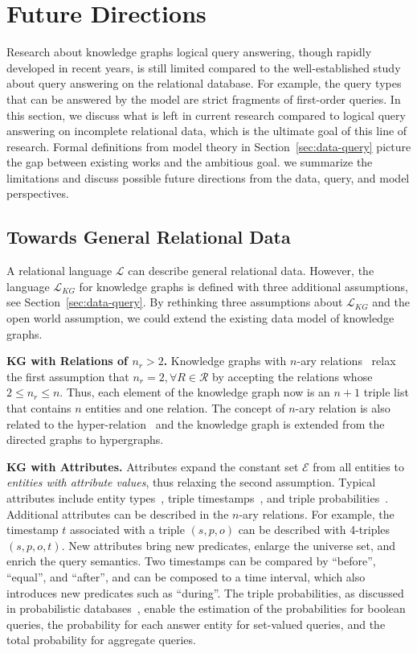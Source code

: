 \documentclass[11pt]{article}
\newcommand{\entity}{\mathcal{E}}
\newcommand{\relation}{\mathcal{R}}
\newcommand{\lang}{\mathcal{L}}
\begin{document}
\section{Future Directions}\label{sec:future}
Research about knowledge graphs logical query answering, though rapidly developed in recent years, is still limited compared to the well-established study about query answering on the relational database. For example, the query types that can be answered by the model are strict fragments of first-order queries.
In this section, we discuss what is left in current research compared to logical query answering on incomplete relational data, which is the ultimate goal of this line of research. Formal definitions from model theory in Section~\ref{sec:data-query} picture the gap between existing works and the ambitious goal. we summarize the limitations and discuss possible future directions from the data, query, and model perspectives.

\subsection{Towards General Relational Data}
A relational language $\lang$ can describe general relational data. However, the language $\lang_{KG}$ for knowledge graphs is defined with three additional assumptions, see Section~\ref{sec:data-query}. By rethinking three assumptions about $\lang_{KG}$ and the open world assumption, we could extend the existing data model of knowledge graphs.

\noindent\textbf{KG with Relations of $n_r > 2$.} Knowledge graphs with $n$-ary relations~\cite{Zhang2022FactTreeReasoning} relax the first assumption that $n_r=2, \forall R\in \relation$ by accepting the relations whose $2\leq n_r \leq n$. Thus, each element of the knowledge graph now is an $n+1$ triple list that contains $n$ entities and one relation. The concept of $n$-ary relation is also related to the hyper-relation~\cite{Galkin2020MessagePassing,Alivanistos2022QueryEmbedding} and the knowledge graph is extended from the directed graphs to hypergraphs.

\noindent\textbf{KG with Attributes.} Attributes expand the constant set $\entity$ from all entities to \textit{entities with attribute values}, thus relaxing the second assumption. Typical attributes include entity types~\cite{Auer2007DBpediaNucleus,Hu2022TypeawareEmbeddings}, triple timestamps~\cite{Jia2021ComplexTemporal,Saxena2021QuestionAnswering}, and triple probabilities~\cite{Carlson2010ArchitectureNeverEnding}. Additional attributes can be described in the $n$-ary relations. For example, the timestamp $t$ associated with a triple $(s, p, o)$ can be described with 4-triples $(s, p, o, t)$. New attributes bring new predicates, enlarge the universe set, and enrich the query semantics. Two timestamps can be compared by ``before'', ``equal'', and ``after'', and can be composed to a time interval, which also introduces new predicates such as ``during''. The triple probabilities, as discussed in probabilistic databases~\cite{VandenBroeck2017QueryProcessing}, enable the estimation of the probabilities for boolean queries, the probability for each answer entity for set-valued queries, and the total probability for aggregate queries.
\end{document}
